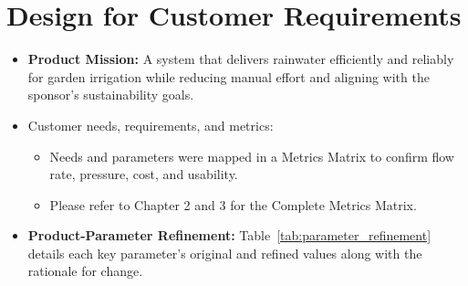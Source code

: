 \documentclass[12pt]{report}
\begin{document}
\section{Design for Customer Requirements}
\begin{itemize}
    \item \textbf{Product Mission:}  
    A system that delivers rainwater efficiently and reliably for garden irrigation while reducing manual effort and aligning with the sponsor's sustainability goals.

    \item Customer needs, requirements, and metrics:
    \begin{itemize}
        \item Needs and parameters were mapped in a Metrics Matrix to confirm flow rate, pressure, cost, and usability.
        \item Please refer to Chapter 2 and 3 for the Complete Metrics Matrix.
    \end{itemize}

    \item \textbf{Product-Parameter Refinement:}  Table~\ref{tab:parameter_refinement} details each key parameter’s original and refined values along with the rationale for change.
\end{itemize}
\end{document}
